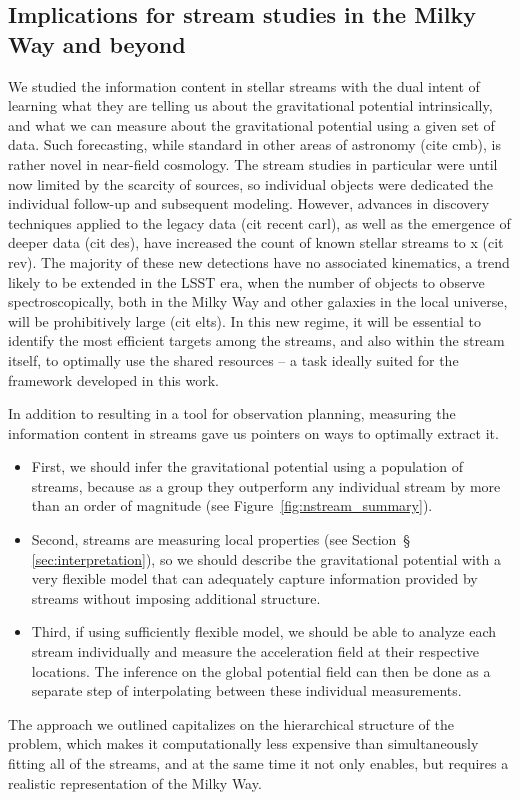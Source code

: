 \documentclass[modern]{aastex61}
\begin{document}
\subsection{Implications for stream studies in the Milky Way and beyond}
\label{sec:dis_applications}
We studied the information content in stellar streams with the dual intent of learning what they are telling us about the gravitational potential intrinsically, and what we can measure about the gravitational potential using a given set of data.
Such forecasting, while standard in other areas of astronomy (cite cmb), is rather novel in near-field cosmology.
The stream studies in particular were until now limited by the scarcity of sources, so individual objects were dedicated the individual follow-up and subsequent modeling.
However, advances in discovery techniques applied to the legacy data (cit recent carl), as well as the emergence of deeper data (cit des), have increased the count of known stellar streams to x (cit rev).
The majority of these new detections have no associated kinematics, a trend likely to be extended in the LSST era, when the number of objects to observe spectroscopically, both in the Milky Way and other galaxies in the local universe, will be prohibitively large (cit elts).
In this new regime, it will be essential to identify the most efficient targets among the streams, and also within the stream itself, to optimally use the shared resources -- a task ideally suited for the framework developed in this work.

In addition to resulting in a tool for observation planning, measuring the information content in streams gave us pointers on ways to optimally extract it.
\begin{itemize}
\item{First, we should infer the gravitational potential using a population of streams, because as a group they outperform any individual stream by more than an order of magnitude (see Figure~\ref{fig:nstream_summary}).}
\item{Second, streams are measuring local properties (see Section~\S\,\ref{sec:interpretation}), so we should describe the gravitational potential with a very flexible model that can adequately capture information provided by streams without imposing additional structure.}
\item{Third, if using sufficiently flexible model, we should be able to analyze each stream individually and measure the acceleration field at their respective locations.
The inference on the global potential field can then be done as a separate step of interpolating between these individual measurements.}
\end{itemize}
The approach we outlined capitalizes on the hierarchical structure of the problem, which makes it computationally less expensive than simultaneously fitting all of the streams, and at the same time it not only enables, but requires a realistic representation of the Milky Way.
\end{document}

